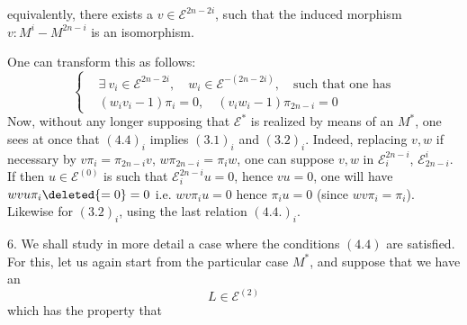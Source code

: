 equivalently, there exists a $v\in\mathcal E^{2n-2i}$, such that the induced morphism $v:M^i-M^{2n-i}$ is an isomorphism.

One can transform this as follows:
\[
\left\{\begin{aligned}
&\exists\ v_i\in\mathcal E^{2n-2i},\quad w_i\in\mathcal E^{-(2n-2i)},\quad\text{such that one has}\\
&(w_iv_i-1)\pi_i=0,\quad(v_iw_i-1)\pi_{2n-i}=0
\end{aligned}\right.
\tag*{$(4.4)_i$}
\]
Now, without any longer supposing that $\mathcal E^*$ is realized by means of an $M^*$, one sees at once that $(4.4)_i$ implies $(3.1)_i$ and $(3.2)_i$. Indeed, replacing $v,w$ if necessary by $v\pi_i=\pi_{2n-i}v$, $w\pi_{2n-i}=\pi_iw$, one can suppose $v,w$ in $\mathcal E_i^{2n-i}$, $\mathcal E_{2n-i}^i$. If then  $u\in\mathcal E^{(0)}$ is such that $\mathcal E_i^{2n-i}u=0$, hence $vu=0$, one will have $wvu\pi_i\deleted{=0}=0$ i.e. $wv\pi_i u=0$ hence $\pi_i u=0$ (since $wv\pi_i=\pi_i$). Likewise for $(3.2)_i$, using the last relation $(4.4.)_i$.


6. We shall study in more detail a case where the conditions $(4.4)$ are satisfied. For this, let us again start from the particular case $M^*$,  and suppose that we have an
\[
L\in\mathcal E^{(2)}
\tag{6.0}
\]
which has the property that
